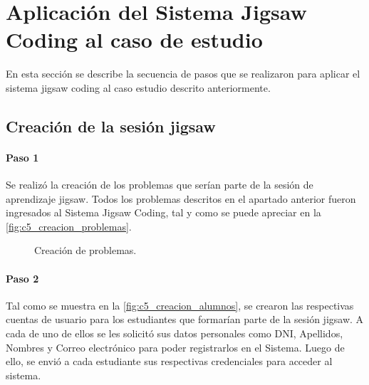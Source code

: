 \section{Aplicación del Sistema Jigsaw Coding al caso de estudio}
En esta sección se describe la secuencia de pasos que se realizaron para aplicar el sistema jigsaw coding al caso estudio descrito anteriormente.

\subsection{Creación de la sesión jigsaw}

\paragraph{Paso 1}
Se realizó la creación de los problemas que serían parte de la sesión de aprendizaje jigsaw. Todos los problemas descritos en el apartado anterior fueron ingresados al Sistema Jigsaw Coding, tal y como se puede apreciar en la \autoref{fig:c5_creacion_problemas}.

\begin{figure}
\centering
\caption{Creación de problemas.}
\label{fig:c5_creacion_problemas}
\end{figure}

\paragraph{Paso 2}
Tal como se muestra en la \autoref{fig:c5_creacion_alumnos}, se crearon las respectivas cuentas de usuario para los estudiantes que formarían parte de la sesión jigsaw. A cada de uno de ellos se les solicitó sus datos personales como DNI, Apellidos, Nombres y Correo electrónico para poder registrarlos en el Sistema. Luego de ello, se envió a cada estudiante sus respectivas credenciales para acceder al sistema.

